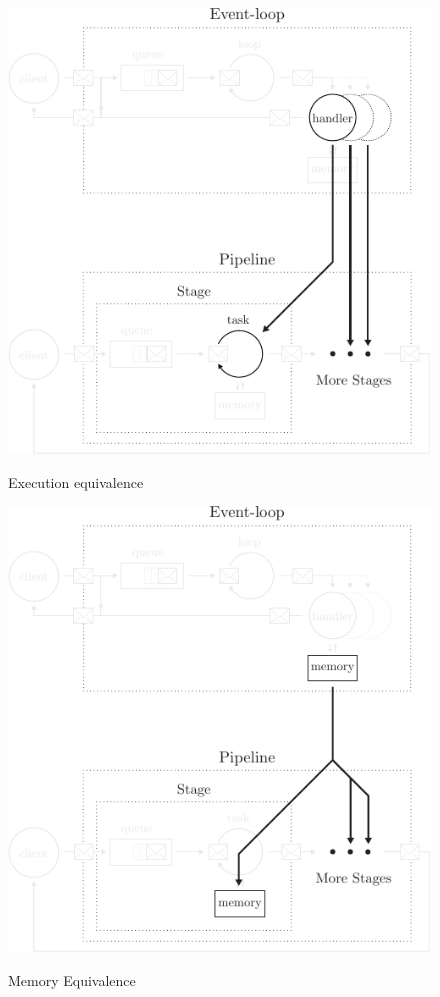\begin{figure}[h!]
  \centering
  \begin{minipage}{0.49\textwidth}
    \centering
    \includegraphics[width=\linewidth]{../resources/run-equivalence.pdf}
    \label{fig:run-equivalence}
    \caption{Execution equivalence}
  \end{minipage}
  \vrule
  \hfill
  \begin{minipage}{0.49\textwidth}
    \centering
    \includegraphics[width=\linewidth]{../resources/mem-equivalence.pdf}
    \label{fig:mem-equivalence}
    \caption{Memory Equivalence}
  \end{minipage}
\end{figure}

